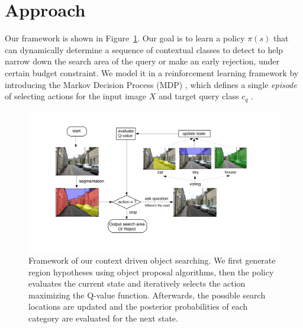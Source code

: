 \section{Approach}

Our framework is shown in Figure~\ref{fig:flowchart}. Our goal is to learn a policy $\pi(s)$ that can dynamically determine a sequence of contextual  classes to detect to help narrow down the search area of the query or
make an early rejection, under certain budget constraint. We model it in a reinforcement learning framework by introducing the Markov Decision Process (MDP) , which defines a single \textit{episode} of selecting actions for the input image $X$ and target query class
$c_q$ .

\begin{figure}[htb]
\begin{center}
\includegraphics[width=\linewidth]{figures/flowchart_Q.pdf}
\caption{Framework of our context driven object searching. We first generate region hypotheses using object proposal algorithms, then the policy evaluates the current state and iteratively selects the action maximizing the Q-value function. Afterwards, the possible search locations are updated and the posterior probabilities of each category are evaluated for the next state.}
\label{fig:flowchart}
\end{center}

\end{figure}

